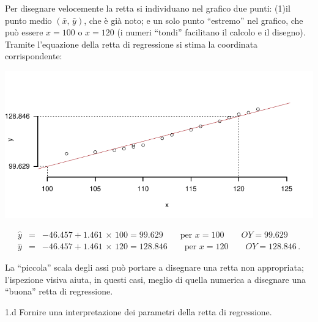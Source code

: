 \documentclass[
  11pt,
]{book}
\theoremstyle{mytheoremstyle}
\theoremstyle{mydefstyle}
\newenvironment{sol}
  {
  \begin{tcolorbox}[enhanced,breakable,arc=0.1mm,boxrule=1pt,colback=white,colframe=iblue,
  title=\bf \fontfamily{lmss}\selectfont \hspace{.5 cm} Soluzione,drop fuzzy shadow]

}{
\end{tcolorbox}
  }
\begin{document}
\begin{sol}
Per disegnare velocemente la retta si individuano nel grafico due punti:
(1)il punto medio \((\bar{x},\, \bar{y})\), che è già noto; e un solo
punto ``estremo'' nel grafico, che può essere \(x=100\) o \(x=120\)
(i numeri ``tondi'' facilitano il calcolo e il disegno).
Tramite l'equazione della retta di regressione si stima
la coordinata corrispondente:

\begin{center}\includegraphics{Esami_passati_con_soluzioni_files/figure-latex/06-regr-48-1} \end{center}

\begin{eqnarray*}
\widehat{y} &=& -46.457 + 1.461 \,\times\, 100 = 99.629
                \qquad \mbox{per $x=100$} \qquad OY= 99.629 \\
\widehat{y} &=& -46.457 + 1.461 \,\times\, 120 = 128.846
                \qquad \mbox{per $x=120$} \qquad OY= 128.846\, .
\end{eqnarray*}

La ``piccola'' scala degli assi può portare a disegnare una retta
non appropriata; l'ispezione visiva aiuta, in questi casi, meglio
di quella numerica a disegnare una ``buona'' retta di regressione.

\end{sol}

1.d Fornire una interpretazione dei parametri della retta di regressione.
\end{document}
